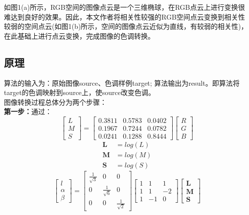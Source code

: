 \documentclass[12pt]{article}
\begin{document}
		如图1(a)所示，RGB空间的图像点云是一个三维椭球，在RGB点云上进行变换很难达到良好的效果。因此，本文作者将相关性较强的RGB空间点云变换到相关性较弱的空间点云(如图1(b)所示，空间的图像点云近似为直线，有较弱的相关性)，在此基础上进行点云变换，完成图像的色调转换。
		
		\newpage
		\subsection{原理}
		算法的输入为：原始图像source、色调样例target; 算法输出为result。即算法将target的色调映射到source上，使source改变色调。\\
		
		图像转换过程总体分为两个步骤：\\ 
		
		\textbf{第一步：}通过：
		\begin{equation*}
			{\left[ \begin{array}{ccc}
					L\\
					M\\
					S
				\end{array} 
				\right ]}={
				\left[ \begin{array}{ccc}
					0.3811 & 0.5783 & 0.0402\\
					0.1967& 0.7244 & 0.0782\\
					0.0241 & 0.1288 & 0.8444
				\end{array} 
				\right ]}{\left[ \begin{array}{ccc}
					R\\
					G\\
					B
				\end{array} 
				\right ]} 
		\end{equation*} 
		\begin{align*}
			\textbf{L} &= log(L) \\
			\textbf{M} &= log(M) \\
			\textbf{S} &= log(S)
		\end{align*}
	\begin{equation*}
		{\left[ \begin{array}{ccc}
				l\\
				\alpha\\
				\beta
			\end{array} 
			\right ]}={
			\left[ \begin{array}{ccc}
				\frac{1}{\sqrt{3}} & 0 & 0\\
				0& \frac{1}{\sqrt{6}} & 0\\
				0 & 0 & \frac{1}{\sqrt{2}}
			\end{array} 
			\right ]}
		{
			\left[ \begin{array}{ccc}
				1 & 1 & 1\\
				1& 1 & -2\\
				1 & -1 & 0
			\end{array} 
			\right ]}{\left[ \begin{array}{ccc}
				\textbf{L}\\
				\textbf{M}\\
				\textbf{S}
			\end{array} 
			\right ]} 
	\end{equation*} 
\end{document}
